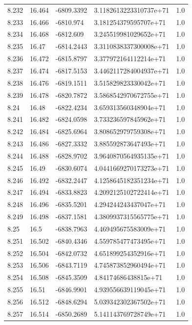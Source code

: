 \begin{tabular}{lllll}
8.232 & 16.464 & -6809.3392 & 3.1182613223310737e+71 & 1.0 \\
8.233 & 16.466 & -6810.974 & 3.181254379595707e+71 & 1.0 \\
8.234 & 16.468 & -6812.609 & 3.245519981029652e+71 & 1.0 \\
8.235 & 16.47 & -6814.2443 & 3.3110838337300008e+71 & 1.0 \\
8.236 & 16.472 & -6815.8797 & 3.377972164112214e+71 & 1.0 \\
8.237 & 16.474 & -6817.5153 & 3.4462117284004937e+71 & 1.0 \\
8.238 & 16.476 & -6819.1511 & 3.515829823330042e+71 & 1.0 \\
8.239 & 16.478 & -6820.7872 & 3.5868542970672755e+71 & 1.0 \\
8.24 & 16.48 & -6822.4234 & 3.659313560348904e+71 & 1.0 \\
8.241 & 16.482 & -6824.0598 & 3.733236597845962e+71 & 1.0 \\
8.242 & 16.484 & -6825.6964 & 3.808652979759308e+71 & 1.0 \\
8.243 & 16.486 & -6827.3332 & 3.885592873647493e+71 & 1.0 \\
8.244 & 16.488 & -6828.9702 & 3.9640870564935135e+71 & 1.0 \\
8.245 & 16.49 & -6830.6074 & 4.0441669270173273e+71 & 1.0 \\
8.246 & 16.492 & -6832.2447 & 4.1258645182351234e+71 & 1.0 \\
8.247 & 16.494 & -6833.8823 & 4.2092125102722414e+71 & 1.0 \\
8.248 & 16.496 & -6835.5201 & 4.294244243437047e+71 & 1.0 \\
8.249 & 16.498 & -6837.1581 & 4.3809937315565775e+71 & 1.0 \\
8.25 & 16.5 & -6838.7963 & 4.469495675583009e+71 & 1.0 \\
8.251 & 16.502 & -6840.4346 & 4.559785477473495e+71 & 1.0 \\
8.252 & 16.504 & -6842.0732 & 4.651899254352916e+71 & 1.0 \\
8.253 & 16.506 & -6843.7119 & 4.745873852960494e+71 & 1.0 \\
8.254 & 16.508 & -6845.3509 & 4.84174686438815e+71 & 1.0 \\
8.255 & 16.51 & -6846.9901 & 4.939556639119045e+71 & 1.0 \\
8.256 & 16.512 & -6848.6294 & 5.039342302367502e+71 & 1.0 \\
8.257 & 16.514 & -6850.2689 & 5.141143769728749e+71 & 1.0 \\

\end{tabular}
